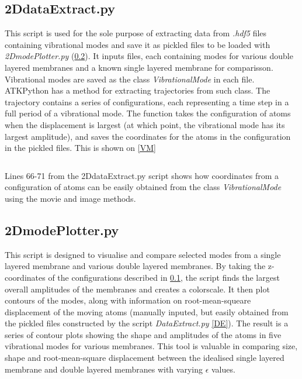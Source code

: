 \subsection{2DdataExtract.py}\label{2DE}
This script is used for the sole purpose of extracting data from \textit{.hdf5} files containing vibrational modes and save it as pickled files to be loaded with \textit{2DmodePlotter.py} (\cref{2DMP}). It inputs files, each containing modes for various double layered membranes and a known single layered membrane for comparisson. Vibrational modes are saved as the class \textit{VibrationalMode} in each file. ATKPython has a method for extracting trajectories from such class. The trajectory contains a series of configurations, each representing a time step in a full period of a vibrational mode. The function takes the configuration of atoms when the displacement is largest (at which point, the vibrational mode has its largest amplitude), and saves the coordinates for the atoms in the configuration in the pickled files. This is shown on \cref{VM}
\onecolumngrid

\begin{listing}[H]
 \inputminted[python3=true,bgcolor=Black,linenos=true,firstline=66,lastline=71]{python}{VNL/PythonScripts/Scripts/2DdataExtract.py}
 \caption{Lines 66-71 from the 2DdataExtract.py script shows how coordinates from a configuration of atoms can be easily obtained from the class \textit{VibrationalMode} using the movie and image methods.}
 \label{VM}
\end{listing}
\twocolumngrid
\subsection{2DmodePlotter.py}\label{2DMP}
This script is designed to visualise and compare selected modes from a single layered membrane and various double layered membranes. By taking the z-coordinates of the configurations described in \cref{2DE}, the script finds the largest overall amplitudes of the membranes and creates a colorscale. It then plot contours of the modes, along with information on root-mean-squeare displacement of the moving atoms (manually inputed, but easily obtained from the pickled files constructed by the script \textit{DataExtract.py} \cref{DE}). The result is a series of contour plots showing the shape and amplitudes of the atoms in five vibrational modes for various membranes. This tool is valuable in comparing size, shape and root-mean-square displacement between the idealised single layered membrane and double layered membranes with varying $\epsilon$ values.
